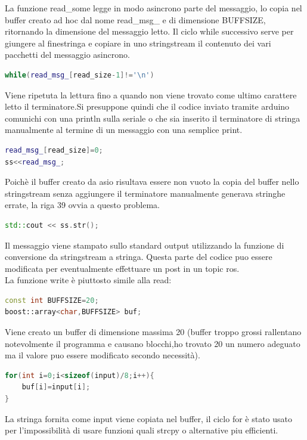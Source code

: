 \documentclass[a4paper]{article}
\begin{document}
La funzione read\_some legge in modo asincrono parte del messaggio, lo copia nel buffer creato ad hoc dal nome read\_msg\_ e di dimensione BUFFSIZE, ritornando la dimensione del messaggio letto.
Il ciclo while successivo serve per giungere al finestringa e copiare in uno stringstream il contenuto dei vari pacchetti del messaggio asincrono.

\begin{lstlisting}[language=C++,firstnumber=38]
while(read_msg_[read_size-1]!='\n')
\end{lstlisting}
Viene ripetuta la lettura fino a quando non viene trovato come ultimo carattere letto il terminatore.Si presuppone quindi che il codice inviato tramite arduino comunichi con una println sulla seriale o che sia inserito il terminatore di stringa manualmente al termine di un messaggio con una semplice print.

\begin{lstlisting}[language=C++,firstnumber=39]
read_msg_[read_size]=0;
ss<<read_msg_;
\end{lstlisting}
Poichè il buffer creato da asio risultava essere non vuoto la copia del buffer nello stringstream senza aggiungere il terminatore manualmente generava stringhe errate, la riga 39 ovvia a questo problema.

\begin{lstlisting}[language=C++,firstnumber=45]
std::cout << ss.str();
\end{lstlisting}

Il messaggio viene stampato sullo standard output utilizzando la funzione di conversione da stringstream a stringa. Questa parte del codice puo essere modificata per eventualmente effettuare un post in un topic ros.
\\
La funzione write è piuttosto simile alla read:

\begin{lstlisting}[language=C++,firstnumber=21]
const int BUFFSIZE=20;	
boost::array<char,BUFFSIZE> buf;
\end{lstlisting}
Viene creato un buffer di dimensione massima 20 (buffer troppo grossi rallentano notevolmente il programma e causano blocchi,ho trovato 20 un numero adeguato ma il valore puo essere modificato secondo necessità).

\begin{lstlisting}[language=C++,firstnumber=24]
for(int i=0;i<sizeof(input)/8;i++){		
    buf[i]=input[i];
}
\end{lstlisting}
La stringa fornita come input viene copiata nel buffer, il ciclo for è stato usato per l'impossibilità di usare funzioni quali strcpy o alternative piu efficienti.
\end{document}

